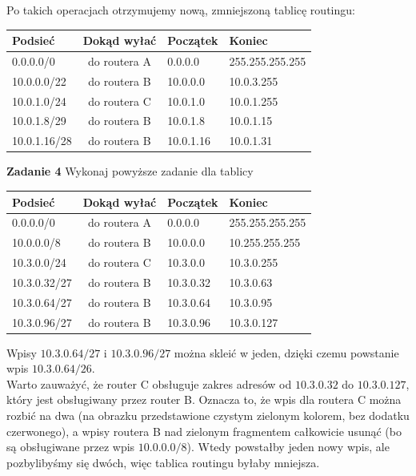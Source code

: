 \documentclass[a4paper,12pt]{article}
\begin{document}
\noindent Po takich operacjach otrzymujemy nową, zmniejszoną tablicę routingu:
\begin{center}
    \begin{tabular}{|l|c|l|l|}
        \hline
        Podsieć        & Dokąd wyłać  & Początek    & Koniec \\ 
        \hline
        0.0.0.0/0      & do routera A & 0.0.0.0     & 255.255.255.255 \\
        10.0.0.0/22    & do routera B & 10.0.0.0    & 10.0.3.255 \\
        10.0.1.0/24    & do routera C & 10.0.1.0    & 10.0.1.255 \\
        10.0.1.8/29    & do routera B & 10.0.1.8    & 10.0.1.15 \\
        10.0.1.16/28   & do routera B & 10.0.1.16   & 10.0.1.31 \\ \hline
    \end{tabular}
\end{center}

\noindent \newline \textbf{Zadanie 4} \newline
Wykonaj powyższe zadanie dla tablicy
\begin{center}
    \begin{tabular}{|l|c|l|l|}
        \hline
        Podsieć        & Dokąd wyłać  & Początek    & Koniec \\ 
        \hline
        0.0.0.0/0      & do routera A & 0.0.0.0     & 255.255.255.255 \\
        10.0.0.0/8     & do routera B & 10.0.0.0    & 10.255.255.255 \\
        10.3.0.0/24    & do routera C & 10.3.0.0    & 10.3.0.255 \\
        10.3.0.32/27   & do routera B & 10.3.0.32   & 10.3.0.63 \\
        10.3.0.64/27   & do routera B & 10.3.0.64   & 10.3.0.95 \\
        10.3.0.96/27   & do routera B & 10.3.0.96   & 10.3.0.127 \\ \hline
    \end{tabular}
\end{center}

\noindent Wpisy $10.3.0.64/27$ i $10.3.0.96/27$ można skleić w jeden, dzięki
czemu powstanie wpis $10.3.0.64/26$. \\

\noindent Warto zauważyć, że router C obsługuje zakres adresów od $10.3.0.32$ 
do $10.3.0.127$, który jest obsługiwany przez router B. Oznacza to, że wpis
dla routera C można rozbić na dwa (na obrazku przedstawione czystym zielonym
kolorem, bez dodatku czerwonego), a wpisy routera B nad zielonym fragmentem
całkowicie usunąć (bo są obsługiwane przez wpis $10.0.0.0/8$). Wtedy powstałby
jeden nowy wpis, ale pozbylibyśmy się dwóch, więc tablica routingu byłaby
mniejsza.
\end{document}
